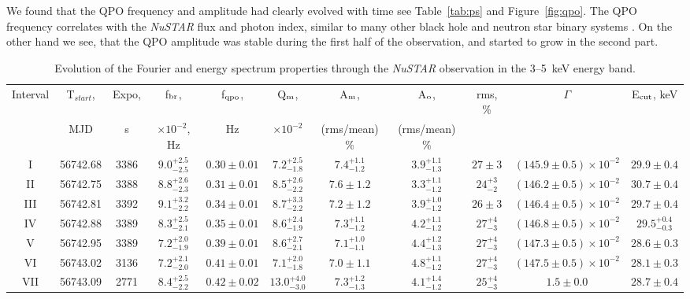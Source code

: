 \documentclass[a4paper,fleqn,usenatbib]{mnras}
\begin{document}
We found that the QPO frequency and amplitude had clearly evolved with time see Table~\ref{tab:ps} and Figure~\ref{fig:qpo}.
The QPO frequency correlates with the {\it NuSTAR} flux and photon index, similar to many other black hole and neutron star binary systems \citep[see, e.g.,][]{2003A&A...397..729V,2003A&A...407.1039P}.
On the other hand we see, that the QPO amplitude was stable during the first half of the observation, and started to grow in the second part.

\begin{table}
\noindent
\centering
\caption{Evolution of the Fourier and energy spectrum properties through the {\it NuSTAR} observation in the 3--5~keV energy band.}
\label{tab:timing}
\centering
\begin{tabular}{|c|c|c|c|c|c|c|c|c|c|c|}
\hline\hline
Interval & T$_{start}$, & Expo,  & f$_{\rm br}$, & f$_{\rm qpo}$, & Q$_{\rm m}$, & A$_{\rm m}$, & A$_{\rm o}$,& rms, \% & $\Gamma$ & E$_{\rm cut}$, keV \\
            &  MJD &  s & $\times10^{-2}$, Hz &  Hz & $\times10^{-2}$ & (rms/mean) \% &  (rms/mean) \%   &  & & \\
\hline
I &  	56742.68 & 3386 & $9.0_{-2.5}^{+2.5}$ & $0.30\pm0.01$ & $7.2_{-1.8}^{+2.5}$ & $7.4_{-1.2}^{+1.1}$ & $3.9_{-1.3}^{+1.1}$ & $27\pm3$ & $(145.9\pm0.5)\times10^{-2}$ & $29.9\pm0.4$ \\
II & 56742.75 & 3388 & $8.8_{-2.3}^{+2.6}$ & $0.31\pm0.01$ & $8.5_{-2.2}^{+2.6}$ & $7.6\pm1.2$ & $3.3_{-1.2}^{+1.1}$ & $24_{-2}^{+3}$ & $(146.2\pm0.5)\times10^{-2}$ & $30.7\pm0.4$ \\
III &  56742.81 & 3392 & $9.1_{-2.2}^{+3.2}$ & $0.34\pm0.01$ & $8.7_{-2.2}^{+3.3}$ & $7.2\pm1.2$ & $3.9_{-1.2}^{+1.0}$ & $26\pm3$ & $(146.4\pm0.5)\times10^{-2}$ & $29.7\pm0.4$ \\
IV &  56742.88 & 3389 & $8.3_{-2.1}^{+2.5}$ & $0.35\pm0.01$ & $8.6_{-1.9}^{+2.4}$ & $7.3_{-1.2}^{+1.1}$ & $4.2_{-1.2}^{+1.1}$ & $27_{-3}^{+4}$ & $(146.8\pm0.5)\times10^{-2}$ & $29.5_{-0.3}^{+0.4}$ \\
V &  56742.95 & 3389 & $7.2_{-1.9}^{+2.0}$ & $0.39\pm0.01$ & $8.6_{-2.1}^{+2.7}$ & $7.1_{-1.1}^{+1.0}$ & $4.4_{-1.3}^{+1.2}$ & $27_{-3}^{+4}$ & $(147.3\pm0.5)\times10^{-2}$ & $28.6\pm0.3$ \\
VI &  56743.02 & 3136 & $7.2_{-2.0}^{+2.1}$ & $0.41\pm0.01$ & $7.1_{-1.8}^{+2.0}$ & $7.0\pm1.1$ & $4.8_{-1.2}^{+1.1}$ & $27_{-3}^{+4}$ & $(147.5\pm0.5)\times10^{-2}$ & $28.1\pm0.3$ \\
VII & 56743.09 & 2771 & $8.4_{-2.2}^{+2.5}$ & $0.42\pm0.02$ & $13.0_{-3.0}^{+4.0}$ & $7.3_{-1.3}^{+1.2}$ & $4.1_{-1.2}^{+1.4}$ & $25_{-3}^{+4}$ & $1.5\pm0.0$ & $28.7\pm0.4$ \\

\end{tabular}
\end{table}
\end{document}
